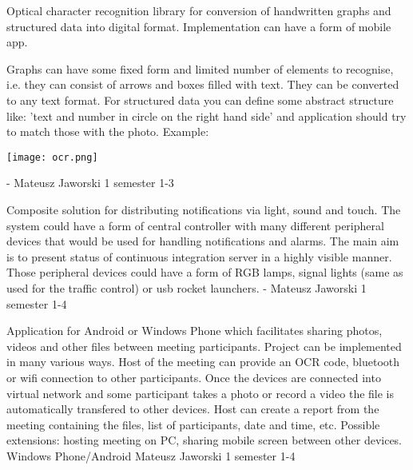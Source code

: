\begin{project}
{}
{Optical character recognition library for conversion of handwritten graphs and structured data into digital format.
Implementation can have a form of mobile app.} 
{ 
Graphs can have some fixed form and limited number of elements to recognise, i.e. 
they can consist of arrows and boxes filled with text. They can be converted to any text format.
For structured data you can define some abstract structure like: 'text and
number in circle on the right hand side' and application should try to match
those with the photo. Example:
\begin{center}\texttt{[image: ocr.png]}\end{center}
}
{-}
{Mateusz Jaworski}
{1 semester}
{1-3}
\end{project}
\begin{project}
{}
{Composite solution for distributing notifications via light, sound and touch.}
{
The system could have a form of central controller with many different 
peripheral devices that would be used for handling notifications and alarms. 
The main aim is to present status of continuous integration server in a highly visible manner. 
Those peripheral devices could have a form of RGB lamps, signal lights (same as used for the traffic control) or usb rocket launchers.
}
{-}
{Mateusz Jaworski}
{1 semester}
{1-4}
\end{project}
\begin{project}
{}
{Application for Android or Windows Phone which facilitates sharing photos,
videos and other files between meeting participants.} 
{
Project can be implemented in many various ways. Host of the meeting can
provide an OCR code, bluetooth or wifi connection to other participants. Once
the devices are connected into virtual network and some participant takes a
photo or record a video the file is automatically transfered to other devices.
Host can create a report from the meeting containing the files, list of
participants, date and time, etc. Possible extensions: hosting meeting on PC,
sharing mobile screen between other devices.}
{Windows Phone/Android}
{Mateusz Jaworski}
{1 semester}
{1-4}
\end{project}
